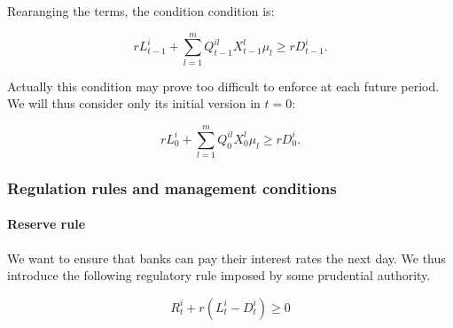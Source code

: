 \documentclass{article}
\begin{document}
Rearanging the terms, the condition condition is:

$$rL_{t-1}^i + \sum_{l=1}^{m} Q_{t-1}^{il} X^l_{t-1}\mu_l \geq rD_{t-1}^i.$$

Actually this condition may prove too difficult to enforce at each future period. We will thus consider only its initial version in $t=0$:

\begin{equation}\label{eq:nolosers}
rL_0^i + \sum_{l=1}^{m} Q_0^{il} X_0^l\mu_l \geq rD_0^i.
\end{equation}


\subsubsection{Regulation rules and management conditions}\label{subsub: rules and conditions}





\paragraph{Reserve rule}
We want to ensure that banks can pay their interest rates the next day. We thus introduce the following regulatory rule imposed by some prudential authority.

\begin{equation}\label{eq:rsvrule}
R_t^i + r(L_t^i - D_t^i) \geq 0
\end{equation}
\end{document}

